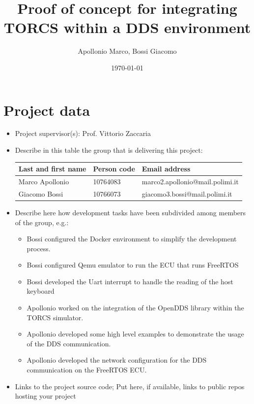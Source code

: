\documentclass[10pt,a4]{article}
\author{Apollonio Marco, Bossi Giacomo}
\date{\today}
\title{Proof of concept for integrating TORCS within a DDS environment}
\begin{document}
\maketitle
\tableofcontents


\section{Project data}

\begin{itemize}
  \item
        Project supervisor(s): Prof. Vittorio Zaccaria

  \item
        Describe in this table the group that is delivering this project:

        \begin{center}
          \begin{tabular}{lll}
            Last and first name & Person code & Email address                   \\
            \hline
            Marco Apollonio     & 10764083    & marco2.apollonio@mail.polimi.it \\
            Giacomo Bossi       & 10766073    & giacomo3.bossi@mail.polimi.it
          \end{tabular}
        \end{center}

  \item
        Describe here how development tasks have been subdivided among members
        of the group, e.g.:

        \begin{itemize}
          \item Bossi configured the Docker environment to simplify the development process.
          \item Bossi configured Qemu emulator to run the ECU that runs FreeRTOS
          \item Bossi developed the Uart interrupt to handle the reading of the host keyboard
          \item Apollonio worked on the integration of the OpenDDS library within the TORCS simulator.
          \item Apollonio developed some high level examples to demonstrate the usage of the DDS communication.
          \item Apollonio developed the network configuration for the DDS communication on the FreeRTOS ECU.
        \end{itemize}

  \item Links to the project source code; Put here, if available, links to public repos hosting your project

\end{itemize}
\end{document}
